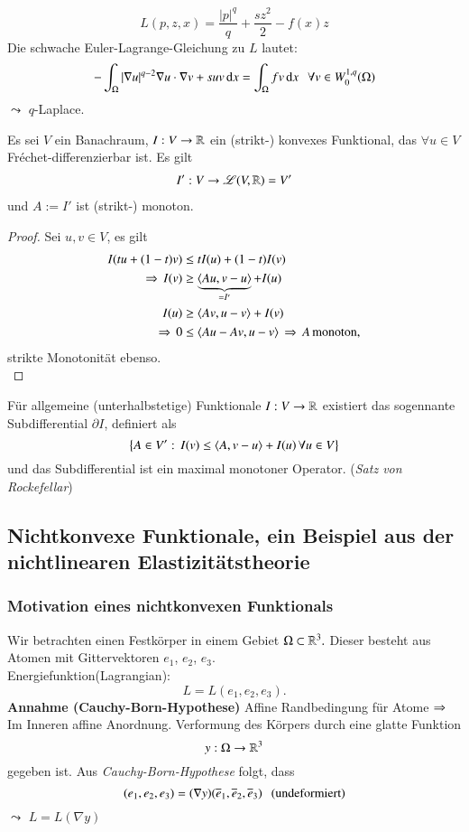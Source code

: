 \begin{beispiel}
    \[
        L(p,z,x)= \frac{|p|^q}{q} + \frac{sz^2}2 -f(x) z
    \]
    Die schwache Euler-Lagrange-Gleichung zu $L$ lautet:
    \[
        -\int_\Omega |\nabla u|^{q-2} \nabla u \cdot \nabla v + suv\, \mathrm{d} x = \int_\Omega fv\, \mathrm{d} x \hspace{.25cm} \forall
        v\in W_0^{1,q}(\Omega)
    \]
    $\leadsto$ $q$-Laplace.
\end{beispiel}

\begin{remark}
    Es sei $V$ ein Banachraum, $I:V\rightarrow \mathbb{R}$ ein (strikt-) konvexes Funktional, das $\forall u\in V$
    Fréchet-differenzierbar ist. Es gilt
    \begin{align*}
        I':V\rightarrow \mathscr L(V,\mathbb{R})= V'
    \end{align*}
    und $A:= I'$ ist (strikt-) monoton.
\end{remark}

\begin{proof}
    Sei $u,v\in V$, es gilt
    \begin{align*}
        I(tu+(1-t)v) &\leq tI(u) + (1-t)I(v)\\
        \Rightarrow \, I(v)&\geq \underbrace{\left\langle Au,v-u \right\rangle}_{=I'} + I(u)\\
        I(u)&\geq \left\langle Av, u-v\right\rangle + I(v)\\
        \Rightarrow \, 0&\leq \left\langle Au-Av,u-v \right\rangle \, \Rightarrow \, A \, \text{monoton},
    \end{align*}
    strikte Monotonität ebenso. \[ \]
\end{proof}

Für allgemeine (unterhalbstetige) Funktionale $I:V\rightarrow\mathbb{R}$ existiert das sogennante Subdifferential
$\partial I$, definiert als
\[
    \left\{A\in V':\, I(v)\leq \left\langle A,v-u\right\rangle + I(u)\, \forall u\in V\right\}
\]
und das Subdifferential ist ein maximal monotoner Operator. (\textit{Satz von Rockefellar})

\subsection*{Nichtkonvexe Funktionale, ein Beispiel aus der nichtlinearen Elastizitätstheorie}

\subsubsection*{Motivation eines nichtkonvexen Funktionals}

Wir betrachten einen Festkörper in einem Gebiet $\Omega\subset\mathbb{R}^3.$ Dieser besteht aus Atomen mit
Gittervektoren $e_1$, $e_2$, $e_3$.\\
\noindent Energiefunktion(Lagrangian):
\[
    L=L(e_1,e_2,e_3).
\]
\textbf{Annahme (Cauchy-Born-Hypothese)} Affine Randbedingung für Atome $\Rightarrow$ Im Inneren affine
Anordnung. Verformung des Körpers durch eine glatte Funktion
\[
    y:\Omega\rightarrow \mathbb{R}^3
\]
gegeben ist. Aus \textit{Cauchy-Born-Hypothese} folgt, dass
\[
    (e_1,e_2,e_3)= (\nabla y)(\overline e_1, \overline e_2, \overline e_3) \hspace{.25cm}(\text{undeformiert})
\]
$\leadsto$ $L=L(\nabla y)$
